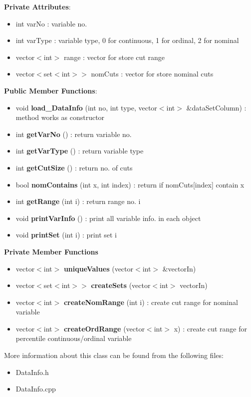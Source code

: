 \documentclass{article}
\begin{document}
\textbf{Private Attributes}:
\begin{itemize}
\item int varNo : variable no.
\item int varType : variable type, 0 for continuous, 1 for ordinal, 2 for nominal
\item vector$<$int$>$ range : vector for store cut range
\item vector$<$set$<$int$>>$ nomCuts : vector for store nominal cuts
\end{itemize}


\textbf{Public Member Functions}:
\begin{itemize}
\item void \textbf{load\_DataInfo} (int no, int type, vector$<$int$>$ \&dataSetColumn) : method works as constructor 
\item int \textbf{getVarNo} () : return variable no.
\item int \textbf{getVarType} () : return variable type
\item int \textbf{getCutSize} () : return no. of cuts 
\item bool \textbf{nomContains} (int x, int index) : return if nomCuts[index] contain x
\item int \textbf{getRange} (int i) : return range no. i
\item void \textbf{printVarInfo} () : print all variable info. in each object
\item void \textbf{printSet} (int i) : print set i
\end{itemize}
\textbf{Private Member Functions}
\begin{itemize}
\item vector$<$int$>$ \textbf{uniqueValues} (vector$<$int$>$ \&vectorIn)
\item vector$<$set$<$int$>>$ \textbf{createSets} (vector$<$int$>$ vectorIn)
\item vector$<$int$>$ \textbf{createNomRange} (int i) : create cut range for nominal variable
\item vector$<$int$>$ \textbf{createOrdRange} (vector$<$int$>$ x) : create cut range for percentile continuous/ordinal variable
\end{itemize}

More information about this class can be found from the following files:
\begin{itemize}
\item DataInfo.h
\item DataInfo.cpp
\end{itemize}
\end{document}
